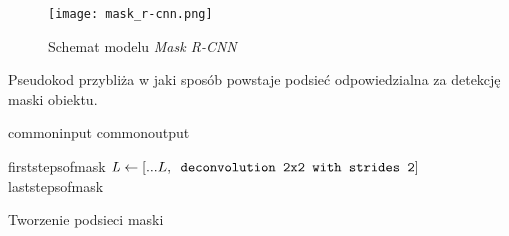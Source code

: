 \begin{figure}[h]
  \centering
  \texttt{[image: mask\_r-cnn.png]}
  \caption{Schemat modelu \textit{Mask R-CNN}}
  \label{fig:mask_r_cnn}
\end{figure}

Pseudokod  przybliża w jaki sposób powstaje podsieć odpowiedzialna za detekcję maski obiektu.

\begin{algorithm}
  {commoninput}
  {commonoutput}
  \begin{algorithmic}[1]
    {firststepsofmask}
    \State $\mathit{L} \gets [...L,\verb| deconvolution 2x2 with strides 2|]$
    {laststepsofmask}
	\end{algorithmic}
	\caption{Tworzenie podsieci maski}
	\label{alg:mask-r-cnn}
\end{algorithm}
